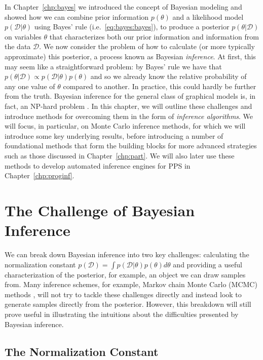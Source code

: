 
In Chapter~\ref{chp:bayes} we introduced the concept of Bayesian modeling and showed how we
can combine prior information $p(\theta)$ and a likelihood model $p(\mathcal{D}|\theta)$ using Bayes' rule 
(i.e.~\eqref{eq:bayes:bayes}), to produce a posterior $p(\theta|\mathcal{D})$ on variables $\theta$ that
characterizes both our prior information and information from the data $\mathcal{D}$.  We now consider the
problem of how to calculate (or more typically approximate) this posterior, a process 
known as Bayesian \emph{inference}.
At first, this may seem like a straightforward problem: by Bayes' rule we have that
$p(\theta|\mathcal{D})\propto p(\mathcal{D}|\theta)p(\theta)$ and so we already know the relative probability of any one
value of $\theta$ compared to another.  In practice, this could hardly be further from the
truth.  Bayesian inference for the general class of graphical models is, in fact, an 
NP-hard problem \citep{cooper1990computational,dagum1993approximating}.  In this chapter,
we will outline these challenges and introduce methods for overcoming them in the form of \emph{inference algorithms}.
We will focus, in particular, on Monte Carlo inference methods, for which we will introduce some
key underlying results, before introducing a number of foundational methods that form the building blocks
for more advanced strategies such as those discussed in Chapter~\ref{chp:part}.  We will also later
use these methods to develop automated inference engines for PPS in Chapter~\ref{chp:proginf}.

\section{The Challenge of Bayesian Inference}
\label{sec:inf:challenge}

We can break down Bayesian inference into two key challenges: calculating the normalization constant
$p(\mathcal{D}) = \int p(\mathcal{D}|\theta)p(\theta)d\theta$ and providing a useful characterization of the posterior, for
example, an object we can draw samples from.  Many inference schemes, for example, Markov
chain Monte Carlo (MCMC) methods \citep{hastings1970monte}, will not
try to tackle these challenges directly and instead look to generate samples directly from 
the posterior.  However, this breakdown will still prove useful in illustrating the intuitions
about the difficulties presented by Bayesian inference.

\subsection{The Normalization Constant}
\label{sec:inf:challenge:norm}

